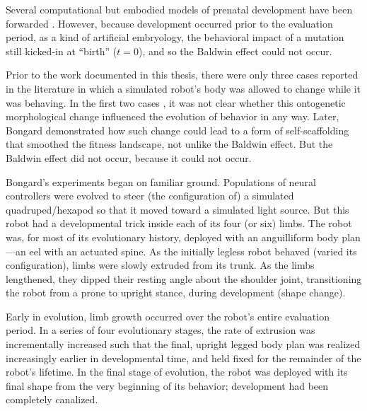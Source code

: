 Several computational but embodied models of prenatal development have been forwarded
\cite{dellaert1994toward,dellaert1996developmental,Eggenberger97,Bongard01,miller2004evolving,basanta2008evolution,doursat2009organically,doursat2014growing,joachimczak2016artificial,mordvintsev2020growing}.
However, because development occurred prior to the evaluation period,
as a kind of artificial embryology,
the behavioral impact of a mutation 
still kicked-in at ``birth'' ($t=0$), and so the Baldwin effect could not occur.


Prior to the work documented in this thesis, there were only three cases reported in the literature in which a simulated robot's body was allowed to change while it was behaving. 
In the first two cases \cite{ventrella1998designing,komosinski2003framsticks}, it was not clear whether this ontogenetic morphological change influenced the evolution of behavior in any way. 
Later, Bongard \cite{bongard2011morphological} demonstrated how such change could lead to a form of self-scaffolding that smoothed the fitness landscape,
not unlike the Baldwin effect.
But the Baldwin effect did not occur, because it could not occur.

Bongard's experiments began on familiar ground.
Populations of neural controllers were evolved to
steer (the configuration of) a simulated quadruped/hexapod so that it moved toward a simulated light source.
But this robot had a developmental trick inside each of its four (or six) limbs.
The robot was, for most of its evolutionary history, deployed with an anguilliform body plan---an eel with an actuated spine.
As the initially legless robot behaved (varied its configuration),
limbs were slowly extruded from its trunk.
As the limbs lengthened, they dipped their resting angle about the shoulder joint, transitioning the robot from a prone to upright stance, during development (shape change).

Early in evolution, limb growth occurred over the robot's entire evaluation period.
In a series of four evolutionary stages,
the rate of extrusion was incrementally increased
such that the final, upright legged body plan was realized increasingly earlier in developmental time, and held fixed for the remainder of the robot's lifetime.
In the final stage of evolution,
the robot was deployed with its final shape from the very beginning of its behavior; development had been completely canalized.

